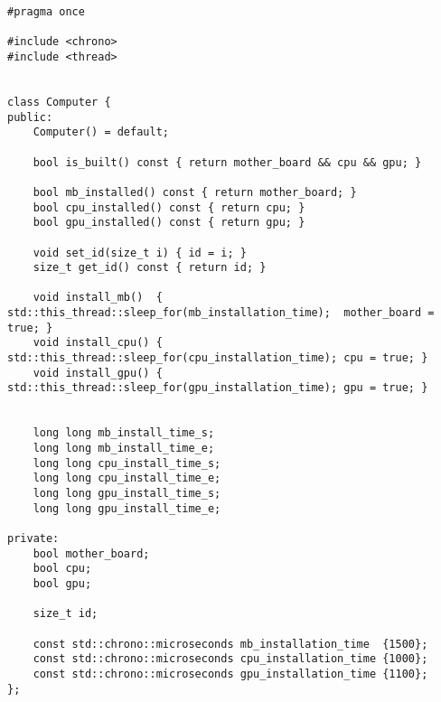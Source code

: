 \begin{lstlisting}[caption=Класс компьютера, label=list:computer, language={}]
#pragma once

#include <chrono>
#include <thread>


class Computer {
public:
    Computer() = default;

    bool is_built() const { return mother_board && cpu && gpu; }
    
    bool mb_installed() const { return mother_board; }
    bool cpu_installed() const { return cpu; }
    bool gpu_installed() const { return gpu; }

    void set_id(size_t i) { id = i; }
    size_t get_id() const { return id; }

    void install_mb()  { std::this_thread::sleep_for(mb_installation_time);  mother_board = true; }
    void install_cpu() { std::this_thread::sleep_for(cpu_installation_time); cpu = true; }
    void install_gpu() { std::this_thread::sleep_for(gpu_installation_time); gpu = true; }


    long long mb_install_time_s;
    long long mb_install_time_e;
    long long cpu_install_time_s;
    long long cpu_install_time_e;
    long long gpu_install_time_s;
    long long gpu_install_time_e;

private:
    bool mother_board;
    bool cpu;
    bool gpu;

    size_t id;

    const std::chrono::microseconds mb_installation_time  {1500};
    const std::chrono::microseconds cpu_installation_time {1000};
    const std::chrono::microseconds gpu_installation_time {1100};
};
\end{lstlisting}


